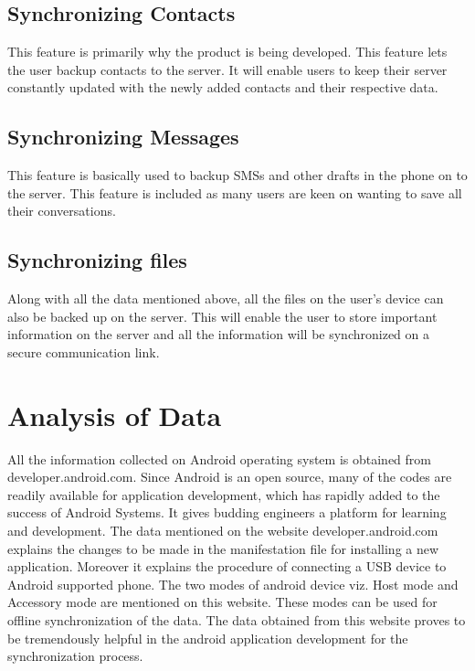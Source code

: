 \subsection{Synchronizing Contacts}
\hspace*{0.82cm}This feature is primarily why the product is being developed. This feature lets the user backup
contacts to the server. It will enable users to keep their server constantly updated with the newly
added contacts and their respective data.

\subsection{Synchronizing Messages}
\hspace*{0.82cm}This feature is basically used to backup SMSs and other drafts in the phone on to the server.
This feature is included as many users are keen on wanting to save all their conversations.

\subsection{Synchronizing files}
\hspace*{0.82cm}Along with all the data mentioned above, all the files on the user’s device can also be backed
up on the server. This will enable the user to store important information on the server and all the
information will be synchronized on a secure communication link.

\section{Analysis of Data}
\hspace*{0.82cm}All the information collected on Android operating system is obtained from
developer.android.com. Since Android is an open source, many of the codes are readily
available for application development, which has rapidly added to the success of Android
Systems. It gives budding engineers a platform for learning and development. The data
mentioned on the website developer.android.com explains the changes to be made in the
manifestation file for installing a new application. Moreover it explains the procedure of
connecting a USB device to Android supported phone. The two modes of android device viz.
Host mode and Accessory mode are mentioned on this website. These modes can be used for
offline synchronization of the data. The data obtained from this website proves to be
tremendously helpful in the android application development for the synchronization process.